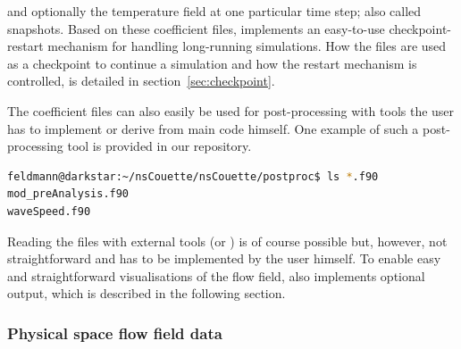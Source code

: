 \documentclass[a4paper, 11pt, DIV=11]{scrartcl}
\begin{document}
and optionally the temperature field at one particular time step; also called
snapshots. Based on these coefficient files, \nsc implements an easy-to-use
checkpoint-restart mechanism for handling long-running simulations. How the
 files are used as a checkpoint to continue a simulation and how
the restart mechanism is controlled, is detailed in section~\ref{sec:checkpoint}.
\par
The coefficient files can also easily be used for post-processing with tools
the user has to implement or derive from main code himself. One example of such
a post-processing tool is provided in our repository.
\begin{lstlisting}[language=bash]
feldmann@darkstar:~/nsCouette/nsCouette/postproc$ ls *.f90
mod_preAnalysis.f90
waveSpeed.f90
\end{lstlisting}
Reading the  files with external tools (\eg \python or \plplot) is
of course possible but, however, not straightforward and has to be implemented
by the user himself. To enable easy and straightforward visualisations of the
flow field, \nsc also implements optional \hdf output, which is described in the
following section.

\subsubsection{Physical space flow field data}
\label{sec:iohdf5}
\end{document}
